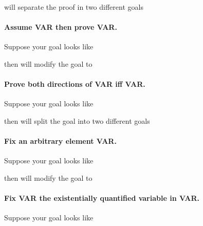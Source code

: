  will separate the proof in two different goals
 

 
\paragraph{\bf Assume VAR then prove VAR.}
Suppose your goal looks like

then 
will modify the goal to




\paragraph{\bf Prove both directions of VAR iff VAR.}

Suppose your goal looks like

then 
will split the goal into two different goals





\paragraph{\bf Fix an arbitrary element VAR.}

Suppose your goal looks like

then 
will modify the goal to


\paragraph{\bf Fix VAR the existentially quantified variable in VAR.}
Suppose your goal looks like

